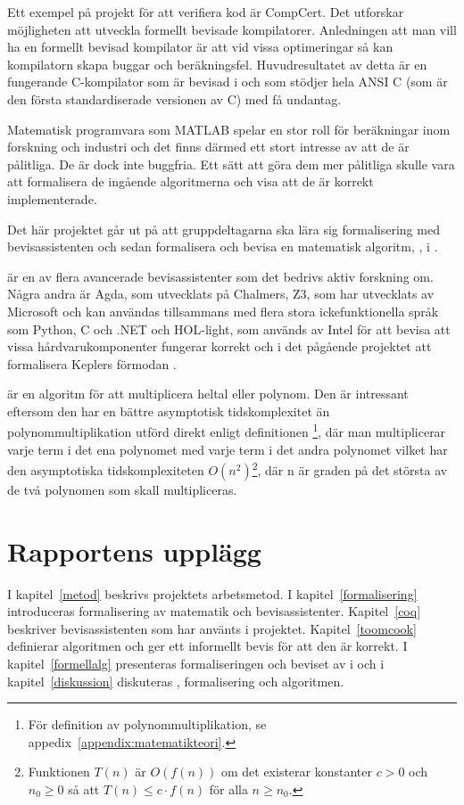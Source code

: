Ett exempel på projekt för att verifiera kod är CompCert. Det utforskar
möjligheten att utveckla formellt bevisade kompilatorer. Anledningen att man
vill ha en formellt bevisad kompilator är att vid vissa optimeringar så kan
kompilatorn skapa buggar och beräkningsfel. Huvudresultatet av detta är en
fungerande C-kompilator som är bevisad i \coq och som stödjer hela ANSI C (som
är den första standardiserade versionen av C) med få
undantag\autocite{compcert}.

Matematisk programvara som MATLAB spelar en stor roll för beräkningar inom
forskning och industri och det finns därmed ett stort intresse av att de är
pålitliga. De är dock inte buggfria. Ett sätt att göra dem mer pålitliga skulle
vara att formalisera de ingående algoritmerna och visa att de är korrekt
implementerade\cite{denes2012refinement}.

Det här projektet går ut på att gruppdeltagarna ska lära sig formalisering med
bevisassistenten \coq och sedan formalisera och bevisa en matematisk algoritm,
\toom, i \coq.

\coq är en av flera avancerade bevisassistenter som det bedrivs aktiv forskning
om. Några andra är Agda, som utvecklats på Chalmers, Z3, som har utvecklats av
Microsoft och kan användas tillsammans med flera stora ickefunktionella språk
som Python, C och .NET och HOL-light, som används av Intel för att bevisa att
vissa hårdvarukomponenter fungerar korrekt och i det pågående projektet att
formalisera Keplers förmodan \cite{hales2008formal}.

\toom är en algoritm för att multiplicera heltal eller polynom. Den är
intressant eftersom den har en bättre asymptotisk tidskomplexitet än
polynommultiplikation utförd direkt enligt definitionen \footnote{För
definition av polynommultiplikation, se
appedix~\ref{appendix:matematikteori}.}, där man multiplicerar varje term i det
ena polynomet med varje term i det andra polynomet vilket har den asymptotiska
tidskomplexiteten $O\left(n^2\right)$\footnote{Funktionen $T(n)$ är $O(f(n))$
om det existerar konstanter $c > 0$ och $n_0 \geq 0$ så att $T(n) \leq c \cdot
f(n)$ för alla $n \geq n_0$.}, där n är graden på det största av de två
polynomen som skall multipliceras.

\section{Rapportens upplägg}
I kapitel~\ref{metod} beskrivs projektets arbetsmetod. I
kapitel~\ref{formalisering} introduceras formalisering av matematik och
bevisassistenter. Kapitel~\ref{coq} beskriver bevisassistenten \coq som har
använts i projektet. Kapitel~\ref{toomcook} definierar algoritmen \toom och ger
ett informellt bevis för att den är korrekt. I kapitel~\ref{formellalg}
presenteras formaliseringen och beviset av \toom i \coq och i
kapitel~\ref{diskussion} diskuteras \coq, formalisering och algoritmen.

